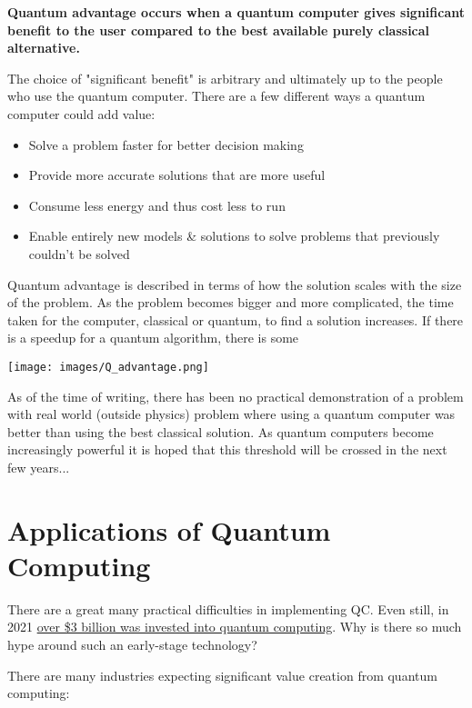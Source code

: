 \documentclass{book}
\begin{document}
\textbf{Quantum advantage occurs when a quantum computer gives significant benefit to the user compared to the best available purely classical alternative.} 

The choice of "significant benefit" is arbitrary and ultimately up to the people who use the quantum computer. There are a few different ways a quantum computer could add value: 

\begin{itemize}
    \item Solve a problem faster for better decision making
    \item Provide more accurate solutions that are more useful 
    \item Consume less energy and thus cost less to run 
    \item Enable entirely new models \& solutions to solve problems that previously couldn't be solved
\end{itemize}

    
Quantum advantage is described in terms of how the solution scales with the size of the problem. As the problem becomes bigger and more complicated, the time taken for the computer, classical or quantum, to find a solution increases. If there is a speedup for a quantum algorithm, there is some 

\texttt{[image: images/Q\_advantage.png]}

As of the time of writing, there has been no practical demonstration of a problem with real world (outside physics) problem where using a quantum computer was better than using the best classical solution. As quantum computers become increasingly powerful it is hoped that this threshold will be crossed in the next few years...


\section{Applications of Quantum Computing}

There are a great many practical difficulties in implementing QC. Even still, in 2021 \href{https://www.mckinsey.com/business-functions/mckinsey-digital/our-insights/quantum-computing-funding-remains-strong-but-talent-gap-raises-concern}{over \$3 billion was invested into quantum computing}. Why is there so much hype around such an early-stage technology? 

There are many industries expecting significant value creation from quantum computing: 
\end{document}

